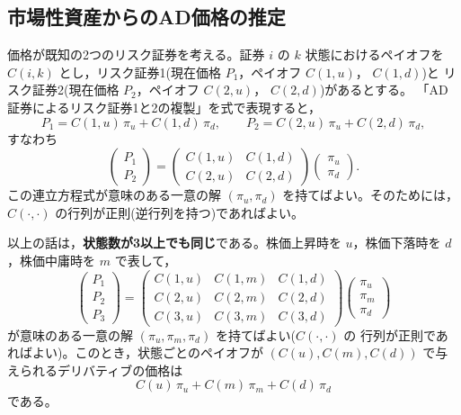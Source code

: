 \subsection{市場性資産からのAD価格の推定}

価格が既知の2つのリスク証券を考える。証券 $i$ の $k$ 状態におけるペイオフを
$C(i,k)$ とし，リスク証券1(現在価格 $P_1$，ペイオフ $C(1,u)$， $C(1,d)$)と
リスク証券2(現在価格 $P_2$，ペイオフ $C(2,u)$， $C(2,d)$)があるとする。
「AD証券によるリスク証券1と2の複製」を式で表現すると，
\begin{equation}
P_1 = C(1,u)\,\pi_u + C(1,d)\,\pi_d,\qquad
P_2 = C(2,u)\,\pi_u + C(2,d)\,\pi_d,
\end{equation}
すなわち
\begin{equation}
\begin{pmatrix} P_1\\ P_2\end{pmatrix}
= \begin{pmatrix} C(1,u) & C(1,d)\\ C(2,u) & C(2,d)\end{pmatrix}
\begin{pmatrix}\pi_u\\ \pi_d\end{pmatrix}.
\end{equation}
この連立方程式が意味のある一意の解 $(\pi_u, \pi_d)$ を持てばよい。そのためには，
$C(\cdot,\cdot)$ の行列が正則(逆行列を持つ)であればよい。

以上の話は，\textbf{状態数が3以上でも同じ}である。株価上昇時を $u$，株価下落時を
$d$，株価中庸時を $m$ で表して，
\begin{equation}
\begin{pmatrix} P_1\\ P_2\\ P_3\end{pmatrix}
= \begin{pmatrix}
C(1,u) & C(1,m) & C(1,d)\\
C(2,u) & C(2,m) & C(2,d)\\
C(3,u) & C(3,m) & C(3,d)
\end{pmatrix}
\begin{pmatrix}\pi_u\\ \pi_m\\ \pi_d\end{pmatrix}
\end{equation}
が意味のある一意の解 $(\pi_u,\pi_m,\pi_d)$ を持てばよい($C(\cdot,\cdot)$ の
行列が正則であればよい)。このとき，状態ごとのペイオフが
$(C(u), C(m), C(d))$ で与えられるデリバティブの価格は
\begin{equation}
C(u)\,\pi_u + C(m)\,\pi_m + C(d)\,\pi_d
\end{equation}
である。

